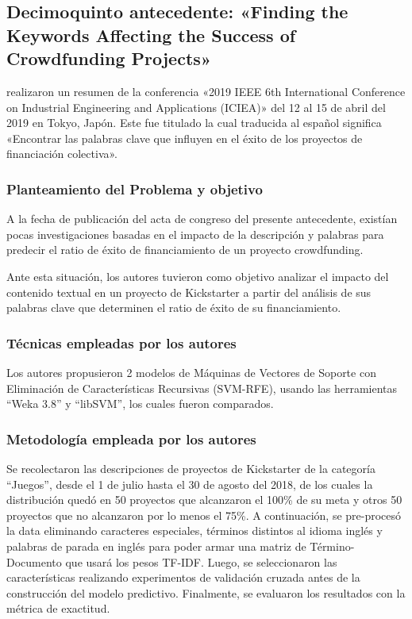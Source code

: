 \subsection{Decimoquinto antecedente: «Finding the Keywords Affecting the Success of Crowdfunding Projects» \citep*{pr_chen2019keywords_crowdfunding}}
\citeauthor{pr_chen2019keywords_crowdfunding} realizaron un resumen de la conferencia «2019 IEEE 6th International Conference on Industrial Engineering and Applications (ICIEA)» del 12 al 15 de abril del 2019 en Tokyo, Japón. Este fue titulado  la cual traducida al español significa «Encontrar las palabras clave que influyen en el éxito de los proyectos de financiación colectiva».

\subsubsection{Planteamiento del Problema y objetivo}
A la fecha de publicación del acta de congreso del presente antecedente, existían pocas investigaciones basadas en el impacto de la descripción y palabras para predecir el ratio de éxito de financiamiento de un proyecto crowdfunding.

Ante esta situación, los autores tuvieron como objetivo analizar el impacto del contenido textual en un proyecto de Kickstarter a partir del análisis de sus palabras clave que determinen el ratio de éxito de su financiamiento.

\subsubsection{Técnicas empleadas por los autores}
Los autores propusieron 2 modelos de Máquinas de Vectores de Soporte con Eliminación de Características Recursivas (SVM-RFE), usando las herramientas “Weka 3.8” y “libSVM”, los cuales fueron comparados.

\subsubsection{Metodología empleada por los autores}
Se recolectaron las descripciones de proyectos de Kickstarter de la categoría “Juegos”, desde el 1 de julio hasta el 30 de agosto del 2018, de los cuales la distribución quedó en 50 proyectos que alcanzaron el 100\% de su meta y otros 50 proyectos que no alcanzaron por lo menos el 75\%. A continuación, se pre-procesó la data eliminando caracteres especiales, términos distintos al idioma inglés y palabras de parada en inglés para poder armar una matriz de Término-Documento que usará los pesos TF-IDF. Luego, se seleccionaron las características realizando experimentos de validación cruzada antes de la construcción del modelo predictivo. Finalmente, se evaluaron los resultados con la métrica de exactitud.

